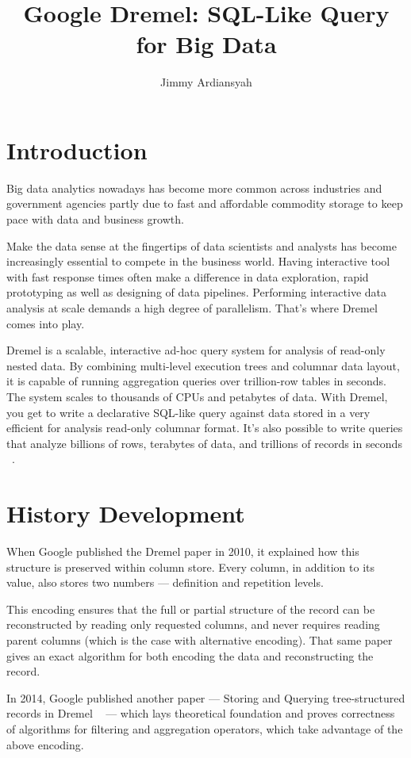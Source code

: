\documentclass[9pt,twocolumn,twoside]{styles/osajnl}
\title{Google Dremel: SQL-Like Query for  Big Data}
\author[1,*]{Jimmy Ardiansyah}
\affil[1]{School of Informatics and Computing, Bloomington, IN 47408, U.S.A.}
\affil[*]{jardians@indiana.edu - S17-IR-2002}
\begin{document}
\maketitle



\section{Introduction}
Big data analytics nowadays has become more common across industries and government agencies partly due to fast and affordable commodity storage to keep pace with data and business growth.  

Make the data sense at the fingertips of data scientists and analysts has become increasingly essential to compete in the business world. Having interactive tool with fast response times often make a difference in data exploration, rapid prototyping as well as designing of data pipelines. Performing interactive data analysis at scale demands a high degree of parallelism. That's where Dremel comes into play.

Dremel is a scalable, interactive ad-hoc query system for analysis of read-only nested data. By combining multi-level execution trees and columnar data layout, it is capable of running aggregation queries over trillion-row tables in seconds.  The system scales to thousands of CPUs and petabytes of data.  With Dremel, you get to write a declarative SQL-like query against data stored in a very efficient for analysis read-only columnar format. It's also possible to write queries that analyze billions of rows, terabytes of data, and trillions of records in seconds ~\cite{paper-dremel}. 

\section{History Development}
When Google published the Dremel paper in 2010, it explained how this structure is preserved within column store. Every column, in addition to its value, also stores two numbers — definition and repetition levels.

This encoding ensures that the full or partial structure of the record can be reconstructed by reading only requested columns, and never requires reading parent columns (which is the case with alternative encoding). That same paper gives an exact algorithm for both encoding the data and reconstructing the record.

In 2014, Google published another paper — Storing and Querying tree-structured records in Dremel ~\cite{www-dremel}  — which lays theoretical foundation and proves correctness of algorithms for filtering and aggregation operators, which take advantage of the above encoding.
\end{document}
